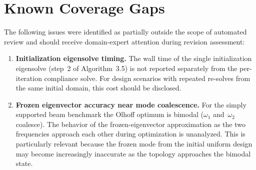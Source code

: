 \documentclass[11pt,a4paper]{article}
\begin{document}

\section*{Known Coverage Gaps}

The following issues were identified as partially outside the scope of automated review
and should receive domain-expert attention during revision assessment:

\begin{enumerate}[label=\textbf{G\arabic*.},nosep]
  \item \textbf{Initialization eigensolve timing.} The wall time of the single
    initialization eigensolve (step~2 of Algorithm~3.5) is not reported separately
    from the per-iteration compliance solve. For design scenarios with repeated
    re-solves from the same initial domain, this cost should be disclosed.
  \item \textbf{Frozen eigenvector accuracy near mode coalescence.} For the simply
    supported beam benchmark the Olhoff optimum is bimodal ($\omega_1$ and~$\omega_2$
    coalesce). The behavior of the frozen-eigenvector approximation as the two
    frequencies approach each other during optimization is unanalyzed. This is
    particularly relevant because the frozen mode from the initial uniform design may
    become increasingly inaccurate as the topology approaches the bimodal state.
\end{enumerate}
\end{document}
